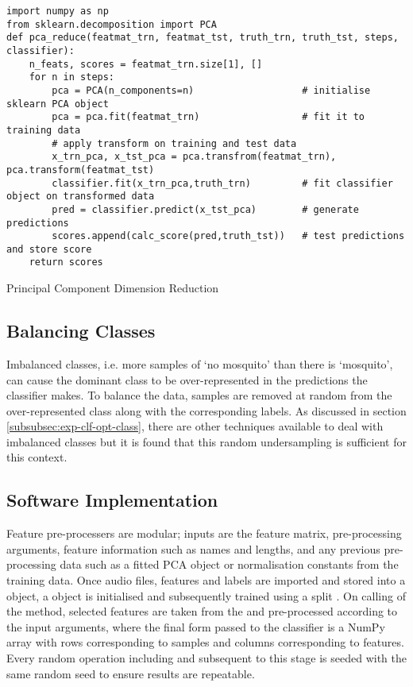         \begin{listing}[ht]
            \begin{verbatim}
import numpy as np
from sklearn.decomposition import PCA
def pca_reduce(featmat_trn, featmat_tst, truth_trn, truth_tst, steps, classifier):
    n_feats, scores = featmat_trn.size[1], []
    for n in steps:
        pca = PCA(n_components=n)                   # initialise sklearn PCA object
        pca = pca.fit(featmat_trn)                  # fit it to training data
        # apply transform on training and test data
        x_trn_pca, x_tst_pca = pca.transfrom(featmat_trn), pca.transform(featmat_tst)
        classifier.fit(x_trn_pca,truth_trn)         # fit classifier object on transformed data
        pred = classifier.predict(x_tst_pca)        # generate predictions
        scores.append(calc_score(pred,truth_tst))   # test predictions and store score
    return scores
            \end{verbatim}
            \caption{Principal Component Dimension Reduction}
            \label{code:pl-featpreproc-sel-pca}
        \end{listing} 
    
    \subsection{Balancing Classes}
    \label{subsec:pl-featpreproc-bal}
        Imbalanced classes, i.e. more samples of `no mosquito' than there is `mosquito', can cause the dominant class to be over-represented in the predictions the classifier makes. To balance the data, samples are removed at random from the over-represented class along with the corresponding labels. As discussed in section \ref{subsubsec:exp-clf-opt-class}, there are other techniques available to deal with imbalanced classes but it is found that this random undersampling is sufficient for this context.
    
    \subsection{Software Implementation}
    \label{subsec:pl-featpreproc-software}
        Feature pre-processers are modular; inputs are the feature matrix, pre-processing arguments, feature information such as names and lengths, and any previous pre-processing data such as a fitted PCA object or normalisation constants from the training data.
        Once audio files, features and labels are imported and stored into a  object, a  object is initialised and subsequently trained using a split . On calling of the  method, selected features are taken from the  and pre-processed according to the input arguments, where the final form passed to the classifier is a NumPy array with rows corresponding to samples and columns corresponding to features. Every random operation including and subsequent to this stage is seeded with the same random seed to ensure results are repeatable.
    